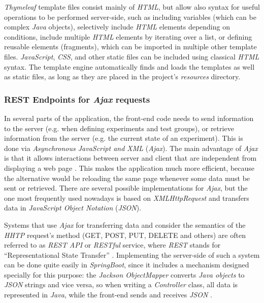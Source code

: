 \documentclass[a4paper]{usiinfbachelorproject}
\begin{document}
\emph{Thymeleaf} template files consist mainly of \emph{HTML}, but allow also syntax for useful operations to
be performed server-side, such as including variables (which can be complex \emph{Java} objects),
selectively include \emph{HTML} elements depending on conditions, include multiple \emph{HTML} elements
by iterating over a list, or defining reusable elements (fragments), which can be imported in
multiple other template files. \emph{JavaScript}, \emph{CSS}, and other static files can be included
using classical \emph{HTML} syntax. The template engine automatically finds and loads the templates as well as
static files, as long as they are placed in the project's \emph{resources} directory.

\subsubsection{\textbf{REST Endpoints for \emph{Ajax} requests}}

In several parts of the application, the front-end code needs to send information to the
server (e.g. when defining experiments and test groups), or retrieve
information from the server (e.g. the current state of an experiment). This is done via
\emph{Asynchronous JavaScript and XML} (\emph{Ajax}).
The main advantage of \emph{Ajax} is that it allows interactions between server and client that are independent from
displaying a web page \cite{ajaxWikipedia}. This makes the application much more efficient, because the alternative would be reloading
the same page whenever some data must be sent or retrieved.
There are several possible implementations for \emph{Ajax}, but the one most frequently used nowadays is based on
\emph{XMLHttpRequest} and transfers data in \emph{JavaScript Object Notation} (\emph{JSON}).

Systems that use \emph{Ajax} for transferring data and consider the semantics of the \emph{HHTP} request's method
(GET, POST, PUT, DELETE and others) are often referred to as \emph{REST API} or \emph{RESTful} service,
where \emph{REST} stands for ``Representational State Transfer'' \cite{restWikipedia}. Implementing the
server-side of such a system can be done quite easily in \emph{SpringBoot}, since it includes a mechanism
designed specially for this purpose: the \emph{Jackson ObjectMapper} converts \emph{Java objects} to \emph{JSON} strings
and vice versa, so when writing a \emph{Controller} class, all data is represented in \emph{Java}, while
the front-end sends and receives \emph{JSON} \cite{baeldungJackson}. 
\end{document}
